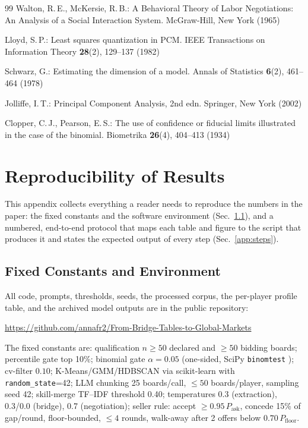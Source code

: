 \documentclass[11pt,a4paper]{article}
\begin{document}
\begin{thebibliography}{99}
Walton, R.\,E., McKersie, R.\,B.:
A Behavioral Theory of Labor Negotiations: An Analysis of a Social
Interaction System.
McGraw-Hill, New York (1965)

Lloyd, S.\,P.:
Least squares quantization in PCM.
IEEE Transactions on Information Theory \textbf{28}(2), 129--137 (1982)

Schwarz, G.:
Estimating the dimension of a model.
Annals of Statistics \textbf{6}(2), 461--464 (1978)

Jolliffe, I.\,T.:
Principal Component Analysis, 2nd edn.
Springer, New York (2002)

Clopper, C.\,J., Pearson, E.\,S.:
The use of confidence or fiducial limits illustrated in the case of the
binomial.
Biometrika \textbf{26}(4), 404--413 (1934)

\end{thebibliography}

\appendix
\section{Reproducibility of Results}\label{app:protocol}

This appendix collects everything a reader needs to reproduce the
numbers in the paper: the fixed constants and the software environment
(Sec.~\ref{app:constants}), and a numbered, end-to-end protocol that
maps each table and figure to the script that produces it and states
the expected output of every step (Sec.~\ref{app:steps}).

\subsection{Fixed Constants and Environment}\label{app:constants}

All code, prompts, thresholds, seeds, the processed corpus, the
per-player profile table, and the archived model outputs are in the
public repository:
\begin{center}\small
\url{https://github.com/annafr2/From-Bridge-Tables-to-Global-Markets}
\end{center}

The fixed constants are: qualification $n\ge50$ declared and $\ge50$
bidding boards; percentile gate top 10\%; binomial gate $\alpha=0.05$
(one-sided, SciPy \texttt{binomtest} \cite{virtanen2020scipy});
cv-filter $0.10$; K-Means/GMM/HDBSCAN via scikit-learn
\cite{pedregosa2011scikit} with \texttt{random\_state}=42; LLM chunking
25 boards/call, $\le50$ boards/player, sampling seed 42; skill-merge
TF--IDF threshold 0.40; temperatures 0.3 (extraction), 0.3/0.0 (bridge),
0.7 (negotiation); seller rule: accept $\ge0.95\,P_{\mathrm{ask}}$,
concede 15\% of gap/round, floor-bounded, $\le4$ rounds, walk-away after
2 offers below $0.70\,P_{\mathrm{floor}}$.
\end{document}
